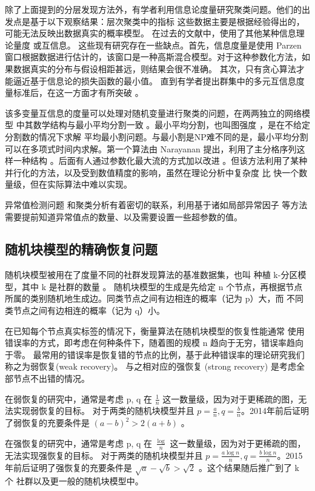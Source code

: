 \documentclass{ctexart}
\begin{document}
除了上面提到的分层发现方法外，有学者利用信息论度量研究聚类问题。他们的出发点是基于以下观察结果：层次聚类中的指标
这些数据主要是根据经验得出的，可能无法反映出数据真实的概率模型。
在过去的文献中，使用了其他某种信息理论量度 \cite{ic2002} 或互信息\cite{mim}。
这些现有研究存在一些缺点。首先，信息度量是使用 Parzen 窗口根据数据进行估计的，该窗口是一种高斯混合模型。对于这种参数化方法，如果数据真实的分布与假设相距甚远，则结果会很不准确。
其次，只有贪心算法才能逼近基于信息论的损失函数的最小值。 
直到有学者提出群集中的多元互信息度量标准后，在这一方面才有所突破 \cite{ic2016}。 

该多变量互信息的度量可以处理对随机变量进行聚类的问题，在两两独立的网络模型 \cite{pin}
中其数学结构与最小平均分割一致  \cite{mac}。最小平均分割，也叫图强度 \cite{cunningham1985optimal}，是在不给定分割数的情况下求解
平均最小割问题。与最小割是NP难不同的是，最小平均分割可以在多项式时间内求解。第一个算法由 Narayanan 提出，利用了主分格序列这样一种结构 \cite{narayanan}。后面有人通过参数化最大流的方式加以改进 \cite{RN17}。但该方法利用了某种并行化的方法，以及受到数值精度的影响，虽然在理论分析中复杂度
比 \cite{narayanan} 快一个数量级，但在实际算法中难以实现。

异常值检测问题 \cite{grubbs1969procedures} 和聚类分析有着密切的联系，利用基于诸如局部异常因子 \cite{Breunig} 等方法需要提前知道异常值点的数量、以及需要设置一些超参数的值。
\subsection{随机块模型的精确恢复问题}
随机块模型被用在了度量不同的社群发现算法的基准数据集，也叫 种植 k-分区模型，其中 k 是社群的数量 。
随机块模型的生成是先给定 n 个节点，再根据节点所属的类别随机地生成边。同类节点之间有边相连的概率（记为 p）大，而
不同类节点之间有边相连的概率（记为 q）小。\cite{abbe2017community}

在已知每个节点真实标签的情况下，衡量算法在随机块模型的恢复性能通常
使用错误率的方式，即考虑在何种条件下，随着图的规模 n 趋向于无穷，错误率趋向于零。
最常用的错误率是恢复错的节点的比例，基于此种错误率的理论研究我们称之为弱恢复(weak recovery)。
与之相对应的强恢复 (strong recovery) 是考虑全部节点不出错的情况。

在弱恢复的研究中，通常是考虑 p, q 在 $\frac{1}{n}$ 这一数量级，因为对于更稀疏的图，无法实现弱恢复的目标。
对于两类的随机块模型并且 $p=\frac{a}{n}, q = \frac{b}{n}$。2014年前后证明了弱恢复的充要条件是 $(a-b)^2 > 2(a+b)$
\cite{mossel2015reconstruction, mossel2018proof}。

在强恢复的研究中，通常是考虑 p, q 在 $\frac{\log}{n}$ 这一数量级，因为对于更稀疏的图，无法实现强恢复的目标。
对于两类的随机块模型并且 $p=\frac{a \log n}{n}, q = \frac{b \log n }{n}$。2015年前后证明了强恢复的充要条件是
$\sqrt{a} - \sqrt{b} > \sqrt{2}$ \cite{abbe2015exact, mossel2016}。这个结果随后推广到了 k 个
社群以及更一般的随机块模型中\cite{abbe2015community}。
\end{document}
